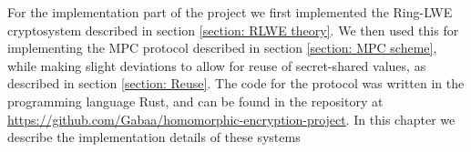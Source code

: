 \documentclass[../main.tex]{subfiles}
\begin{document}
\noindent For the implementation part of the project we first implemented the Ring-LWE cryptosystem described in section \ref{section: RLWE theory}. We then used this for implementing the MPC protocol described in section \ref{section: MPC scheme}, while making slight deviations to allow for reuse of secret-shared values, as described in section \ref{section: Reuse}. The code for the protocol was written in the programming language Rust, and can be found in the repository at \url{https://github.com/Gabaa/homomorphic-encryption-project}.
In this chapter we describe the implementation details of these systems
\end{document}
